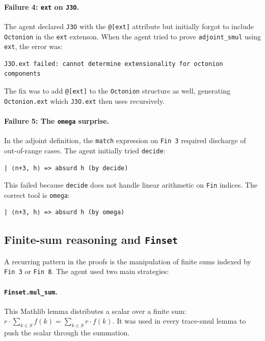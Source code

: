 \documentclass[11pt]{article}
\theoremstyle{definition}
\begin{document}
\paragraph{Failure 4: \texttt{ext} on \texttt{J3O}.}
The agent declared \texttt{J3O} with the \texttt{@[ext]} attribute but
initially forgot to include \texttt{Octonion} in the \texttt{ext}
extenson. When the agent tried to prove \texttt{adjoint\_smul} using
\texttt{ext}, the error was:

\begin{lstlisting}
J3O.ext failed: cannot determine extensionality for octonion components
\end{lstlisting}

The fix was to add \texttt{@[ext]} to the \texttt{Octonion} structure as
well, generating \texttt{Octonion.ext} which \texttt{J3O.ext} then uses
recursively.

\paragraph{Failure 5: The \texttt{omega} surprise.}
In the adjoint definition, the \texttt{match} expression on \texttt{Fin 3}
required discharge of out-of-range cases. The agent initially tried
\texttt{decide}:

\begin{lstlisting}
| ⟨n+3, h⟩ => absurd h (by decide)
\end{lstlisting}

This failed because \texttt{decide} does not handle linear arithmetic on
\texttt{Fin} indices. The correct tool is \texttt{omega}:

\begin{lstlisting}
| ⟨n+3, h⟩ => absurd h (by omega)
\end{lstlisting}

\subsection{Finite-sum reasoning and \texttt{Finset}}
\label{sec:agent-finset}

A recurring pattern in the proofs is the manipulation of finite sums
indexed by \texttt{Fin 3} or \texttt{Fin 8}. The agent used two main
strategies:

\paragraph{\texttt{Finset.mul\_sum}.} This Mathlib lemma distributes a
scalar over a finite sum: $r\cdot\sum_{k\in S}f(k)=\sum_{k\in S}r\cdot
f(k)$. It was used in every trace-smul lemma to push the scalar through
the summation.
\end{document}
